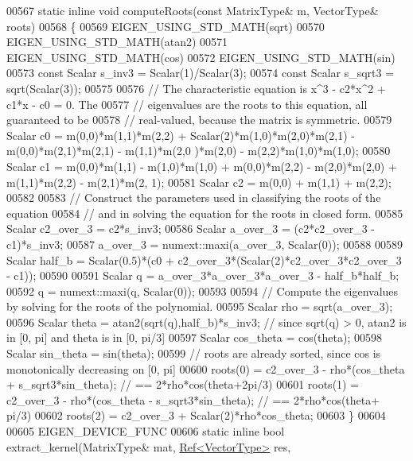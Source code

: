 \begin{DoxyCode}
00567   \textcolor{keyword}{static} \textcolor{keyword}{inline} \textcolor{keywordtype}{void} computeRoots(\textcolor{keyword}{const} MatrixType& m, VectorType& roots)
00568   \{
00569     EIGEN\_USING\_STD\_MATH(sqrt)
00570     EIGEN\_USING\_STD\_MATH(atan2)
00571     EIGEN\_USING\_STD\_MATH(cos)
00572     EIGEN\_USING\_STD\_MATH(sin)
00573     \textcolor{keyword}{const} Scalar s\_inv3 = Scalar(1)/Scalar(3);
00574     \textcolor{keyword}{const} Scalar s\_sqrt3 = sqrt(Scalar(3));
00575 
00576     \textcolor{comment}{// The characteristic equation is x^3 - c2*x^2 + c1*x - c0 = 0.  The}
00577     \textcolor{comment}{// eigenvalues are the roots to this equation, all guaranteed to be}
00578     \textcolor{comment}{// real-valued, because the matrix is symmetric.}
00579     Scalar c0 = m(0,0)*m(1,1)*m(2,2) + Scalar(2)*m(1,0)*m(2,0)*m(2,1) - m(0,0)*m(2,1)*m(2,1) - m(1,1)*m(2,0
      )*m(2,0) - m(2,2)*m(1,0)*m(1,0);
00580     Scalar c1 = m(0,0)*m(1,1) - m(1,0)*m(1,0) + m(0,0)*m(2,2) - m(2,0)*m(2,0) + m(1,1)*m(2,2) - m(2,1)*m(2,
      1);
00581     Scalar c2 = m(0,0) + m(1,1) + m(2,2);
00582 
00583     \textcolor{comment}{// Construct the parameters used in classifying the roots of the equation}
00584     \textcolor{comment}{// and in solving the equation for the roots in closed form.}
00585     Scalar c2\_over\_3 = c2*s\_inv3;
00586     Scalar a\_over\_3 = (c2*c2\_over\_3 - c1)*s\_inv3;
00587     a\_over\_3 = numext::maxi(a\_over\_3, Scalar(0));
00588 
00589     Scalar half\_b = Scalar(0.5)*(c0 + c2\_over\_3*(Scalar(2)*c2\_over\_3*c2\_over\_3 - c1));
00590 
00591     Scalar q = a\_over\_3*a\_over\_3*a\_over\_3 - half\_b*half\_b;
00592     q = numext::maxi(q, Scalar(0));
00593 
00594     \textcolor{comment}{// Compute the eigenvalues by solving for the roots of the polynomial.}
00595     Scalar rho = sqrt(a\_over\_3);
00596     Scalar theta = atan2(sqrt(q),half\_b)*s\_inv3;  \textcolor{comment}{// since sqrt(q) > 0, atan2 is in [0, pi] and theta is in
       [0, pi/3]}
00597     Scalar cos\_theta = cos(theta);
00598     Scalar sin\_theta = sin(theta);
00599     \textcolor{comment}{// roots are already sorted, since cos is monotonically decreasing on [0, pi]}
00600     roots(0) = c2\_over\_3 - rho*(cos\_theta + s\_sqrt3*sin\_theta); \textcolor{comment}{// == 2*rho*cos(theta+2pi/3)}
00601     roots(1) = c2\_over\_3 - rho*(cos\_theta - s\_sqrt3*sin\_theta); \textcolor{comment}{// == 2*rho*cos(theta+ pi/3)}
00602     roots(2) = c2\_over\_3 + Scalar(2)*rho*cos\_theta;
00603   \}
00604 
00605   EIGEN\_DEVICE\_FUNC
00606   \textcolor{keyword}{static} \textcolor{keyword}{inline} \textcolor{keywordtype}{bool} extract\_kernel(MatrixType& mat, \hyperlink{group___core___module_class_eigen_1_1_ref}{Ref<VectorType>} res, 

\end{DoxyCode}
